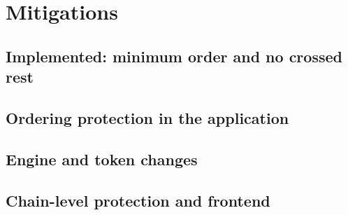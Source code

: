 \section{Mitigations}\label{sec:mitigations}

\subsection{Implemented: minimum order and no crossed rest}
\subsection{Ordering protection in the application}
\subsection{Engine and token changes}
\subsection{Chain-level protection and frontend}

